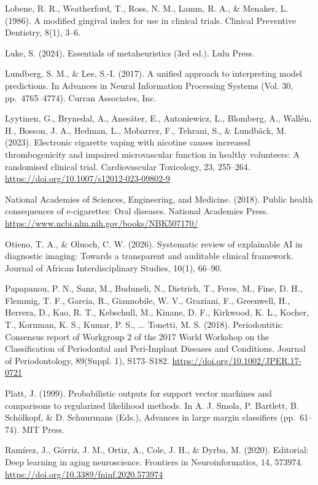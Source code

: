 \documentclass[
]{article}
\begin{document}
Lobene, R. R., Weatherford, T., Ross, N. M., Lamm, R. A., \& Menaker, L.
(1986). A modified gingival index for use in clinical trials. Clinical
Preventive Dentistry, 8(1), 3--6.

Luke, S. (2024). Essentials of metaheuristics (3rd ed.). Lulu Press.

Lundberg, S. M., \& Lee, S.-I. (2017). A unified approach to
interpreting model predictions. In Advances in Neural Information
Processing Systems (Vol. 30, pp.~4765--4774). Curran Associates, Inc.

Lyytinen, G., Brynedal, A., Anesäter, E., Antoniewicz, L., Blomberg, A.,
Wallén, H., Bosson, J. A., Hedman, L., Mobarrez, F., Tehrani, S., \&
Lundbäck, M. (2023). Electronic cigarette vaping with nicotine causes
increased thrombogenicity and impaired microvascular function in healthy
volunteers: A randomised clinical trial. Cardiovascular Toxicology, 23,
255--264. \url{https://doi.org/10.1007/s12012-023-09802-9}

National Academies of Sciences, Engineering, and Medicine. (2018).
Public health consequences of e-cigarettes: Oral diseases. National
Academies Press. \url{https://www.ncbi.nlm.nih.gov/books/NBK507170/}

Otieno, T. A., \& Oluoch, C. W. (2026). Systematic review of explainable
AI in diagnostic imaging: Towards a transparent and auditable clinical
framework. Journal of African Interdisciplinary Studies, 10(1), 66--90.

Papapanou, P. N., Sanz, M., Buduneli, N., Dietrich, T., Feres, M., Fine,
D. H., Flemmig, T. F., Garcia, R., Giannobile, W. V., Graziani, F.,
Greenwell, H., Herrera, D., Kao, R. T., Kebschull, M., Kinane, D. F.,
Kirkwood, K. L., Kocher, T., Kornman, K. S., Kumar, P. S., ... Tonetti,
M. S. (2018). Periodontitis: Consensus report of Workgroup 2 of the 2017
World Workshop on the Classification of Periodontal and Peri-Implant
Diseases and Conditions. Journal of Periodontology, 89(Suppl. 1),
S173--S182. \url{https://doi.org/10.1002/JPER.17-0721}

Platt, J. (1999). Probabilistic outputs for support vector machines and
comparisons to regularized likelihood methods. In A. J. Smola, P.
Bartlett, B. Schölkopf, \& D. Schuurmans (Eds.), Advances in large
margin classifiers (pp.~61--74). MIT Press.

Ramírez, J., Górriz, J. M., Ortiz, A., Cole, J. H., \& Dyrba, M. (2020).
Editorial: Deep learning in aging neuroscience. Frontiers in
Neuroinformatics, 14, 573974.
\url{https://doi.org/10.3389/fninf.2020.573974}
\end{document}
